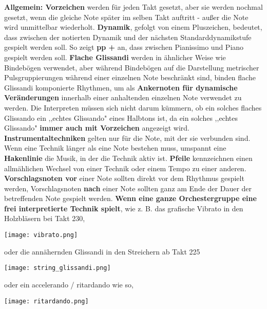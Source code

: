 \documentclass[12pt]{article}
\newcommand*\circled[1]{\tikz[baseline=(char.base)]{
            \node[shape=circle,draw,inner sep=1pt] (char) {#1};}}
\begin{document}
\begingroup
\textbf{Allgemein: \circled{1} Vorzeichen} werden für jeden Takt gesetzt, aber sie werden nochmal gesetzt, wenn die gleiche Note später im selben Takt auftritt - außer die Note wird unmittelbar wiederholt. \textbf{\circled{2} Dynamik}, gefolgt von einem Pluszeichen, bedeutet, dass zwischen der notierten Dynamik und der nächsten Standarddynamikstufe gespielt werden soll. So zeigt \textbf{pp +} an, dass zwischen Pianissimo und Piano gespielt werden soll. \textbf{\circled{3} Flache Glissandi} werden in ähnlicher Weise wie Bindebögen verwendet, aber während Bindebögen auf die Darstellung metrischer Pulsgruppierungen während einer einzelnen Note beschränkt sind, binden flache Glissandi komponierte Rhythmen, um als \textbf{Ankernoten für dynamische Veränderungen} innerhalb einer anhaltenden einzelnen Note verwendet zu werden. Die Interpreten müssen sich nicht darum kümmern, ob ein solches flaches Glissando ein ,,echtes Glissando" eines Halbtons ist, da ein solches ,,echtes Glissando" \textbf{immer auch mit Vorzeichen} angezeigt wird. \textbf{\circled{4} Instrumentaltechniken} gelten nur für die Note, mit der sie verbunden sind. Wenn eine Technik länger als eine Note bestehen muss, umspannt eine \textbf{Hakenlinie} die Musik, in der die Technik aktiv ist. \textbf{\circled{5} Pfeile} kennzeichnen einen allmählichen Wechsel von einer Technik oder einem Tempo zu einer anderen. \textbf{\circled{6} Vorschlagsnoten vor} einer Note sollten direkt vor dem Rhythmus gespielt werden, Vorschlagsnoten \textbf{nach} einer Note sollten ganz am Ende der Dauer der betreffenden Note gespielt werden. \textbf{\circled{7} Wenn eine ganze Orchestergruppe eine frei interpretierte Technik spielt}, wie z. B. das grafische Vibrato in den Holzbläsern bei Takt 230, \\ 
\begin{center}
\texttt{[image: vibrato.png]}
\end{center}
\endgroup

\begingroup
oder die annähernden Glissandi in den Streichern ab Takt 225 \\
\begin{center}
\texttt{[image: string\_glissandi.png]}
\end{center}
\endgroup

\begingroup
oder ein accelerando / ritardando wie so, \\
\begin{center}
\texttt{[image: ritardando.png]}
\end{center}
\endgroup
\end{document}
